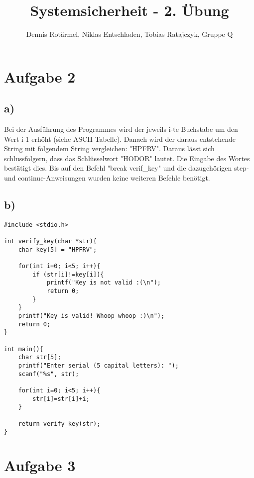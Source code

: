 \documentclass[]{article}
\title{Systemsicherheit - 2. Übung}
\author{Dennis Rotärmel, Niklas Entschladen, Tobias Ratajczyk, Gruppe Q}
\begin{document}
\maketitle
\section{Aufgabe 2}
\subsection*{a)}
Bei der Ausführung des Programmes wird der jeweils i-te Buchstabe um den Wert i-1 erhöht (siehe ASCII-Tabelle).
Danach wird der daraus entstehende String mit folgendem String vergleichen: "HPFRV".
Daraus lässt sich schlussfolgern, dass das Schlüsselwort "HODOR" lautet. Die Eingabe des Wortes bestätigt dies.
Bis auf den Befehl "break verif\_key" und die dazugehörigen step- und continue-Anweisungen wurden keine weiteren Befehle benötigt.
\subsection*{b)}
\begin{lstlisting}
#include <stdio.h>

int verify_key(char *str){
	char key[5] = "HPFRV";

	for(int i=0; i<5; i++){
		if (str[i]!=key[i]){
			printf("Key is not valid :(\n");
			return 0;
		}
	}
	printf("Key is valid! Whoop whoop :)\n");
	return 0;
}
	
int main(){
	char str[5];
	printf("Enter serial (5 capital letters): ");
	scanf("%s", str);
	
	for(int i=0; i<5; i++){
		str[i]=str[i]+i;
	}

	return verify_key(str);
}
\end{lstlisting}
\section{Aufgabe 3}
\end{document}
